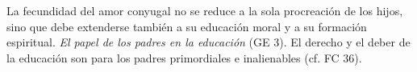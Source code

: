 	
	 La fecundidad del amor conyugal no se reduce a la sola procreación de los hijos, sino que debe extenderse también a su educación moral y a su formación espiritual. \emph{El papel de los padres en la educación}  (GE 3). El derecho y el deber de la educación son para los padres primordiales e inalienables (cf. FC 36).

